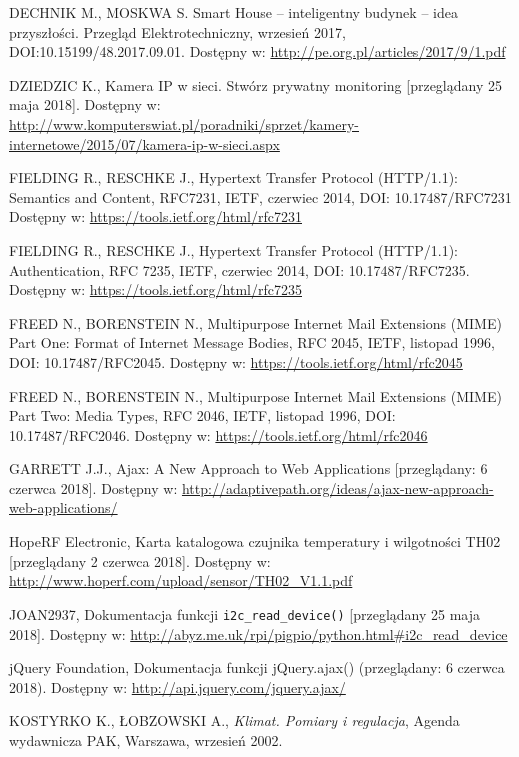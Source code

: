 \documentclass[a4paper,11pt,twoside]{article}
\begin{document}
\begin{thebibliography}{9}
DECHNIK M., MOSKWA S. Smart House – inteligentny budynek – idea przyszłości. Przegląd Elektrotechniczny, wrzesień 2017, DOI:10.15199/48.2017.09.01.
Dostępny w: \url{http://pe.org.pl/articles/2017/9/1.pdf}

\uppercase{Dziedzic K.}, Kamera IP w sieci. Stwórz prywatny monitoring [przeglądany 25 maja 2018].
Dostępny w: \url{http://www.komputerswiat.pl/poradniki/sprzet/kamery-internetowe/2015/07/kamera-ip-w-sieci.aspx}

\uppercase{Fielding R., Reschke J.}, Hypertext Transfer Protocol (HTTP/1.1): Semantics and Content, RFC7231, IETF, czerwiec 2014, DOI: 10.17487/RFC7231
Dostępny w: \url{https://tools.ietf.org/html/rfc7231}

\uppercase{Fielding R., Reschke J.}, Hypertext Transfer Protocol (HTTP/1.1): Authentication, RFC 7235, IETF, czerwiec 2014, DOI: 10.17487/RFC7235.
Dostępny w: \url{https://tools.ietf.org/html/rfc7235}

\uppercase{Freed N., Borenstein N.}, Multipurpose Internet Mail Extensions (MIME) Part One: Format of Internet Message Bodies, RFC 2045, IETF, listopad 1996, DOI: 10.17487/RFC2045.
Dostępny w: \url{https://tools.ietf.org/html/rfc2045}

\uppercase{Freed N., Borenstein N.}, Multipurpose Internet Mail Extensions (MIME) Part Two: Media Types, RFC 2046, IETF, listopad 1996, DOI: 10.17487/RFC2046.
Dostępny w: \url{https://tools.ietf.org/html/rfc2046}

GARRETT J.J., Ajax: A New Approach to Web Applications [przeglądany: 6 czerwca 2018]. Dostępny w: \url{http://adaptivepath.org/ideas/ajax-new-approach-web-applications/}

HopeRF Electronic, Karta katalogowa czujnika temperatury i wilgotności TH02 [przeglądany 2 czerwca 2018].
Dostępny w: \url{http://www.hoperf.com/upload/sensor/TH02_V1.1.pdf}

\uppercase{joan2937}, Dokumentacja funkcji \texttt{i2c{\_}read{\_}device()} [przeglądany 25 maja 2018].
Dostępny w: \url{http://abyz.me.uk/rpi/pigpio/python.html#i2c_read_device}

jQuery Foundation, Dokumentacja funkcji jQuery.ajax() (przeglądany: 6 czerwca 2018). Dostępny w: \url{http://api.jquery.com/jquery.ajax/}

\uppercase{Kostyrko K., Łobzowski A.}, \textit{Klimat. Pomiary i regulacja}, Agenda wydawnicza PAK, Warszawa, wrzesień 2002.


\end{thebibliography}
\end{document}
